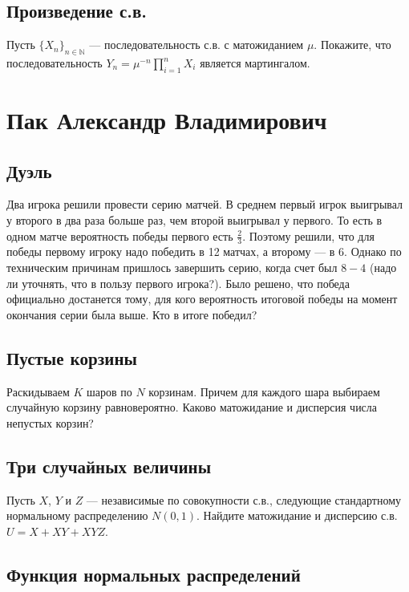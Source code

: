 \documentclass[12pt]{article}
\newcommand\N{\mathbb{N}}
\begin{document}
\subsection{Произведение с.в.}

Пусть $\{X_n\}_{n \in \N}$ --- последовательность с.в. с матожиданием $\mu$. Покажите, что последовательность $Y_n = \mu^{-n} \prod_{i = 1}^n X_i$ является мартингалом.



\newpage
\section{Пак Александр Владимирович}

\subsection{Дуэль}

Два игрока решили провести серию матчей. В среднем первый игрок выигрывал у второго в два раза больше раз, чем второй выигрывал у первого. То есть в одном матче вероятность победы первого есть $\frac{2}{3}$. Поэтому решили, что для победы первому игроку надо победить в 12 матчах, а второму --- в 6. Однако по техническим причинам пришлось завершить серию, когда счет был $8-4$ (надо ли уточнять, что в пользу первого игрока?). Было решено, что победа официально достанется тому, для кого вероятность итоговой победы на момент окончания серии была выше. Кто в итоге победил?



\subsection{Пустые корзины}

Раскидываем $K$ шаров по $N$ корзинам. Причем для каждого шара выбираем случайную корзину равновероятно. Каково матожидание и дисперсия числа непустых корзин?



\subsection{Три случайных величины}

Пусть $X$, $Y$ и $Z$ --- независимые по совокупности с.в., следующие стандартному нормальному распределению $N(0, 1)$. Найдите матожидание и дисперсию с.в. $U = X + XY + XYZ$. 



\subsection{Функция нормальных распределений}
\end{document}
